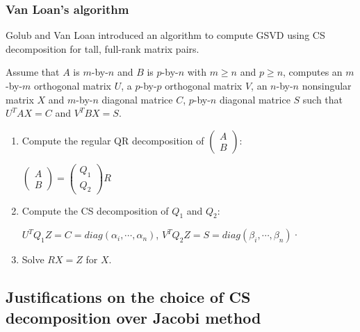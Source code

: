     \subsubsection{Van Loan's algorithm}
    Golub and Van Loan \cite[pp.~502--503]{golub2013matrix} introduced an algorithm to compute GSVD using CS decomposition for tall, full-rank matrix pairs. 
    
    Assume that $A$ is $m$-by-$n$ and $B$ is $p$-by-$n$ with $m \geq n$ and $p \geq n$, computes an $m$-by-$m$ orthogonal matrix $U$, a $p$-by-$p$ orthogonal matrix $V$, an $n$-by-$n$ nonsingular matrix $X$ and $m$-by-$n$ diagonal matrice $C$, $p$-by-$n$ diagonal matrice $S$ such that $U^{T}AX = C$ and $V^{T}BX = S$. 
    
    \begin{enumerate}
        \item Compute the regular QR decomposition of $\begin{pmatrix} A\\ B\end{pmatrix}$:
    
        $\begin{pmatrix}
        A \\ 
        B 
       \end{pmatrix}  = \begin{pmatrix}
        Q_1 \\ 
        Q_2
       \end{pmatrix}R$
       
       \item Compute the CS decomposition of $Q_1$ and $Q_2$:
       
        $U^{T}Q_1Z = C = diag(\alpha_i, \cdots, \alpha_n)$,
        $V^{T}Q_2Z = S = diag(\beta_i, \cdots, \beta_n)$· 
        
        \item Solve $RX = Z$ for $X$.
    \end{enumerate}
    
    \subsection{Justifications on the choice of CS decomposition over Jacobi method}
    